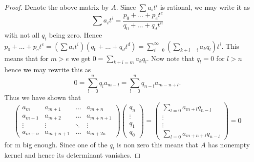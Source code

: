 \documentclass[11pt, a4paper, german]{article}
\theoremstyle{plain}
\theoremstyle{definition}
\begin{document}
\begin{proof}
    Denote the above matrix by $A$. Since $\sum a_it^i$ is rational, we may write it as
    \[
        \sum a_it^i = \frac{p_0 + \dots + p_et^e}{q_0 + \dots + q_d t^n}
    \]
    with not all $q_i$ being zero.
    Hence 
    $p_0 + \dots + p_et^e = \left(\sum a_it^i\right)\left(q_0 + \dots + q_d t^d\right) = \sum_{i=0}^{\infty} \left(\sum_{k+l=i} a_kq_l\right)t^i$.
    This means that for $m > e$ we get $0 = \sum_{k+l=m} a_kq_l$. Now note that $q_l = 0$ for $l > n$ hence we may rewrite this as
    \[
        0 = \sum_{l = 0}^{n} q_la_{m-l} = \sum_{l=0}^n q_{n-l}a_{m-n+l}.
    \]
    Thus we have shown that
    \[
        \begin{pmatrix}
            a_m     & a_{m+1} & \dots & a_{m+n} \\
            a_{m+1} & a_{m+2} & \dots & a_{m+n+1} \\
            \vdots  & \vdots  & \ddots & \vdots \\
            a_{m+n} & a_{m+n+1} & \dots & a_{m+2n}
        \end{pmatrix}
        \begin{pmatrix}
            q_n \\ \vdots \\ q_1 \\ q_0
        \end{pmatrix}
        =
        \begin{pmatrix}
            \sum_{l=0} a_{m+l}q_{n-l} \\ \vdots \\ \vdots \\ \sum_{l=0} a_{m+n+l}q_{n-l}
        \end{pmatrix}
        = 0
    \]
    for m big enough. Since one of the $q_l$ is non zero this means that $A$ has nonempty kernel and hence its determinant vanishes.
\end{proof}
\end{document}
